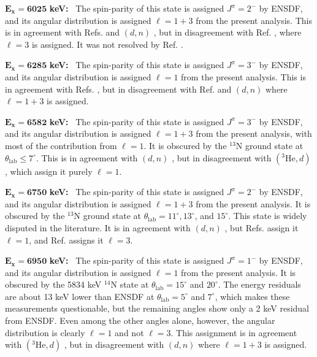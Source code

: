 \emph{$\mathbf{E_{x} = 6025}$} \textbf{keV:} \, 
The spin-parity of this state is assigned $J^{\pi} = 2^{-}$ by ENSDF, and its angular distribution is assigned $\ell=1+3$ from the present analysis. This is in agreement with Refs. \cite{Erskine1966,Seth1967} and $(d,n)$ \cite{Fuchs1969}, but in disagreement with Ref. \cite{Cage1971}, where $\ell=3$ is assigned. It was not resolved by Ref. \cite{Forster1970}.

\emph{$\mathbf{E_{x} = 6285}$} \textbf{keV:} \, 
The spin-parity of this state is assigned $J^{\pi} = 3^{-}$ by ENSDF, and its angular distribution is assigned $\ell=1$ from the present analysis. This is in agreement with Refs. \cite{Erskine1966,Forster1970,Cage1971}, but in disagreement with Ref. \cite{Seth1967} and $(d,n)$ \cite{Fuchs1969} where $\ell=1+3$ is assigned.

\emph{$\mathbf{E_{x} = 6582}$} \textbf{keV:} \, 
The spin-parity of this state is assigned $J^{\pi} = 3^{-}$ by ENSDF, and its angular distribution is assigned $\ell=1+3$ from the present analysis, with most of the contribution from $\ell=1$. It is obscured by the $^{13}$N ground state at $\theta_{\mathrm{lab}} \leq 7^{\circ}$. This is in agreement with $(d,n)$ \cite{Fuchs1969}, but in disagreement with $(^{3}\mathrm{He},d)$ \cite{Erskine1966,Seth1967,Forster1970,Cage1971}, which assign it purely $\ell=1$.

\emph{$\mathbf{E_{x} = 6750}$} \textbf{keV:} \, 
The spin-parity of this state is assigned $J^{\pi} = 2^{-}$ by ENSDF, and its angular distribution is assigned $\ell=1+3$ from the present analysis. It is obscured by the $^{13}$N ground state at $\theta_{\mathrm{lab}} = 11^{\circ}, 13^{\circ}$, and $15^{\circ}$. This state is widely disputed in the literature. It is in agreement with $(d,n)$ \cite{Fuchs1969}, but Refs. \cite{Erskine1966,Seth1967,Forster1970} assign it $\ell=1$, and Ref. \cite{Cage1971} assigns it $\ell=3$.

\emph{$\mathbf{E_{x} = 6950}$} \textbf{keV:} \, 
The spin-parity of this state is assigned $J^{\pi} = 1^{-}$ by ENSDF, and its angular distribution is assigned $\ell=1$ from the present analysis. It is obscured by the 5834 keV $^{14}$N state at $\theta_{\mathrm{lab}} = 15^{\circ}$ and $20^{\circ}$. The energy residuals are about 13 keV lower than ENSDF at $\theta_{\mathrm{lab}} = 5^{\circ}$ and $7^{\circ}$, which makes these measurements questionable, but the remaining angles show only a 2 keV residual from ENSDF. Even among the other angles alone, however, the angular distribution is clearly $\ell=1$ and not $\ell=3$. This assignment is in agreement with $(^{3}\mathrm{He},d)$ \cite{Erskine1966,Seth1967,Forster1970,Cage1971}, but in disagreement with $(d,n)$ \cite{Fuchs1969} where $\ell=1+3$ is assigned.

